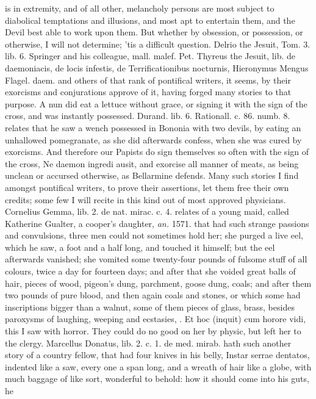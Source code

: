 {{is in extremity, and of all other, melancholy persons are most subject
to diabolical temptations and illusions, and most apt to entertain
them, and the Devil best able to work upon them. But whether by
obsession, or possession, or otherwise, I will not determine; 'tis a
difficult question. Delrio the Jesuit, Tom. 3. lib. 6. Springer and his
colleague, mall. malef. Pet. Thyreus the Jesuit, lib. de daemoniacis,
de locis infestis, de Terrificationibus nocturnis, Hieronymus Mengus
Flagel. daem. and others of that rank of pontifical writers, it seems,
by their exorcisms and conjurations approve of it, having forged many
stories to that purpose. A nun did eat a lettuce without grace,
or signing it with the sign of the cross, and was instantly possessed.
Durand. lib. 6. Rationall. c. 86. numb. 8. relates that he saw a wench
possessed in Bononia with two devils, by eating an unhallowed
pomegranate, as she did afterwards confess, when she was cured by
exorcisms. And therefore our Papists do sign themselves so often with
the sign of the cross, Ne daemon ingredi ausit, and exorcise all manner
of meats, as being unclean or accursed otherwise, as Bellarmine
defends. Many such stories I find amongst pontifical writers, to prove
their assertions, let them free their own credits; some few I will
recite in this kind out of most approved physicians. Cornelius Gemma,
lib. 2. de nat. mirac. c. 4. relates of a young maid, called Katherine
Gualter, a cooper's daughter, \emph{an.} 1571. that had such strange
passions and convulsions, three men could not sometimes hold her; she
purged a live eel, which he saw, a foot and a half long, and touched it
himself; but the eel afterwards vanished; she vomited some twenty-four
pounds of fulsome stuff of all colours, twice a day for fourteen days;
and after that she voided great balls of hair, pieces of wood, pigeon's
dung, parchment, goose dung, coals; and after them two pounds of pure
blood, and then again coals and stones, or which some had inscriptions
bigger than a walnut, some of them pieces of glass, brass, \etc{} besides
paroxysms of laughing, weeping and ecstasies, \etc{}. Et hoc (inquit) cum
horore vidi, this I saw with horror. They could do no good on her by
physic, but left her to the clergy. Marcellus Donatus, lib. 2. c. 1. de
med. mirab. hath such another story of a country fellow, that had four
knives in his belly, Instar serrae dentatos, indented like a saw, every
one a span long, and a wreath of hair like a globe, with much baggage
of like sort, wonderful to behold: how it should come into his guts, he
}}
